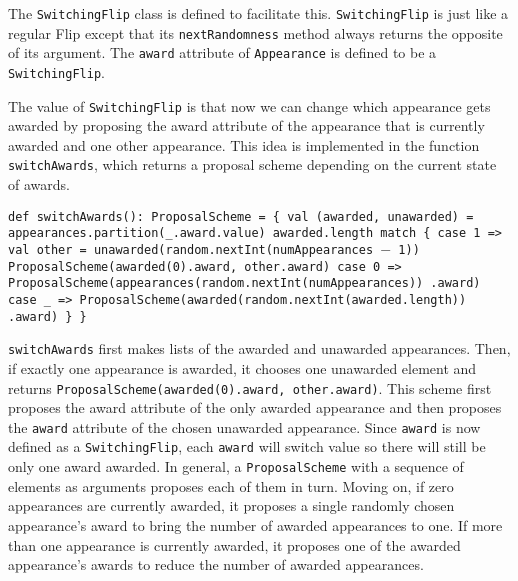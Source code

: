 The \texttt{SwitchingFlip} class is defined to facilitate this. \texttt{SwitchingFlip} is just like a regular Flip except that its \texttt{nextRandomness} method always returns the opposite of its argument. The \texttt{award} attribute of \texttt{Appearance} is defined to be a \texttt{SwitchingFlip}. 

The value of \texttt{SwitchingFlip} is that now we can change which appearance gets awarded by proposing the award attribute of the appearance that is currently awarded and one other appearance. This idea is implemented in the function \texttt{switchAwards}, which returns a proposal scheme depending on the current state of awards.

\begin{flushleft}
\texttt{def switchAwards(): ProposalScheme = \{
\newline \tab val (awarded, unawarded) = 
\newline \tab appearances.partition(\_.award.value)
\newline \tab awarded.length match \{
\newline \tab case 1 =>
\newline \tab val other = unawarded(random.nextInt(numAppearances $-$ 1)) 
\newline \tab ProposalScheme(awarded(0).award, other.award)
\newline \tab case 0 => 
\newline \tab ProposalScheme(appearances(random.nextInt(numAppearances))
\newline \tab .award)
\newline \tab case \_ => 
\newline \tab ProposalScheme(awarded(random.nextInt(awarded.length))
\newline \tab .award)
\newline \}
\newline \}
}
\end{flushleft}

\texttt{switchAwards} first makes lists of the awarded and unawarded appearances. Then, if exactly one appearance is awarded, it chooses one unawarded element and returns \texttt{ProposalScheme(awarded(0).award, other.award)}. This scheme first proposes the award attribute of the only awarded appearance and then proposes the \texttt{award} attribute of the chosen unawarded appearance. Since \texttt{award} is now defined as a \texttt{SwitchingFlip}, each \texttt{award} will switch value so there will still be only one award awarded. In general, a \texttt{ProposalScheme} with a sequence of elements as arguments proposes each of them in turn. Moving on, if zero appearances are currently awarded, it proposes a single randomly chosen appearance's award to bring the number of awarded appearances to one. If more than one appearance is currently awarded, it proposes one of the awarded appearance's awards to reduce the number of awarded appearances.

